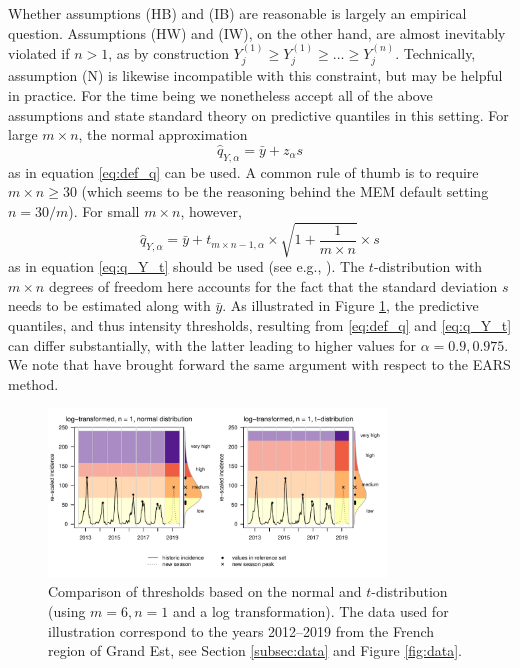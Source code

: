 \documentclass[12pt]{article}
\newcommand{\sd}{s}
\begin{document}
Whether assumptions (HB) and (IB) are reasonable is largely an empirical question. Assumptions (HW) and (IW), on the other hand, are almost inevitably violated if $n > 1$, as by construction $Y_j^{(1)} \geq Y_j^{(1)} \geq \dots \geq Y_j^{(n)}$. Technically, assumption (N) is likewise incompatible with this constraint, but may be helpful in practice.  For the time being we nonetheless accept all of the above assumptions and state standard theory on predictive quantiles in this setting. For large $m\times n$, the normal approximation
$$
\hat{q}_{Y, \alpha} = \bar{y} + z_\alpha \sd
$$
as in equation \eqref{eq:def_q} can be used. A common rule of thumb is to require $m \times n \geq 30$ (which seems to be the reasoning behind the MEM default setting $n = 30/m$). For small $m \times n$, however,
\begin{equation*}
\hat{q}_{Y, \alpha} = \bar{y} + t_{m\times n - 1, \alpha} \times \sqrt{1 + \frac{1}{m\times n}} \times s
\end{equation*}
as in equation \eqref{eq:q_Y_t} should be used (see e.g., \citealt{Preston2000}). The $t$-distribution with $m \times n$ degrees of freedom here accounts for the fact that the standard deviation $s$ needs to be estimated along with $\bar{y}$. As illustrated in Figure \ref{fig:illustration_t}, the predictive quantiles, and thus intensity thresholds, resulting from \eqref{eq:def_q} and \eqref{eq:q_Y_t} can differ substantially, with the latter leading to higher values for $\alpha = 0.9, 0.975$. We note that \cite{Allevius2020} have brought forward the same argument with respect to the EARS method.


\begin{figure}
\begin{center}
\includegraphics[width = 0.8\textwidth, trim={0 5mm 0 0},clip]{figure/illustration_t_normal.pdf}
\end{center}
\caption{Comparison of thresholds based on the normal and $t$-distribution (using $m = 6, n = 1$ and a log transformation). The data used for illustration correspond to the years 2012--2019 from the French region of Grand Est, see Section \ref{subsec:data} and Figure \ref{fig:data}.}
\label{fig:illustration_t}
\end{figure}
\end{document}
